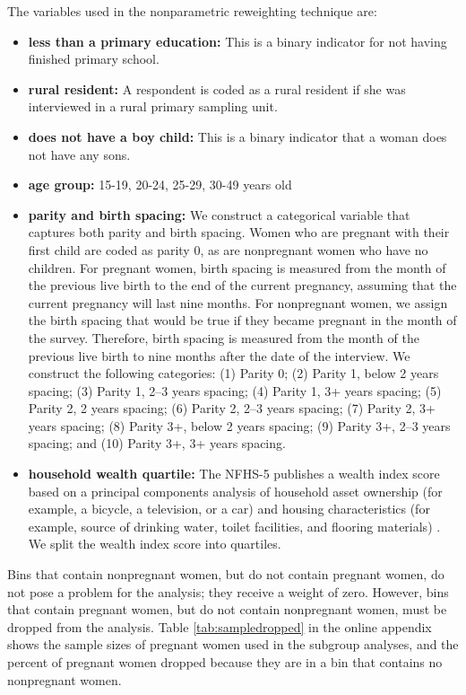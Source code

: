 \documentclass[12pt]{article}
\begin{document}
The variables used in the nonparametric reweighting technique are:
\begin{itemize}
\item {\bf{less than a primary education:}} This is a binary indicator for not having finished primary school.
\item {\bf{rural resident:}} A respondent is coded as a rural resident if she was interviewed in a rural primary sampling unit. 
\item {\bf{does not have a boy child:}} This is a binary indicator that a woman does not have any sons.
\item {\bf{age group:}} 15-19, 20-24, 25-29, 30-49 years old
\item {\bf{parity and birth spacing:}} We construct a categorical variable that captures both parity and birth spacing. Women who are pregnant with their first child are coded as parity 0, as are nonpregnant women who have no children.  For pregnant women, birth spacing is measured from the month of the previous live birth to the end of the current pregnancy, assuming that the current pregnancy will last nine months. For nonpregnant women, we assign the birth spacing that would be true if they became pregnant in the month of the survey.  Therefore, birth spacing is measured from the month of the previous live birth to nine months after the date of the interview. 
We construct the following categories: (1) Parity 0; (2) Parity 1, below 2 years spacing; (3) Parity 1, 2–3 years spacing; (4) Parity 1, 3+ years spacing; (5) Parity 2, 2 years spacing; (6) Parity 2, 2–3 years spacing; (7) Parity 2, 3+ years spacing; (8) Parity 3+, below 2 years spacing; (9) Parity 3+, 2–3 years spacing; and (10) Parity 3+, 3+ years spacing.
\item {\bf{household wealth quartile:}} The NFHS-5 publishes a wealth index score based on a principal components analysis of household asset ownership (for example, a bicycle, a television, or a car) and housing characteristics (for example, source of drinking water, toilet facilities, and flooring materials) \citep{iips_icf_nfhs5_2022}. We split the wealth index score into quartiles. 
\end{itemize}

Bins that contain nonpregnant women, but do not contain pregnant women, do not pose a problem for the analysis; they receive a weight of zero.  However, bins that contain pregnant women, but do not contain nonpregnant women, must be dropped from the analysis. Table \ref{tab:sampledropped} in the online appendix shows the sample sizes of pregnant women used in the subgroup analyses, and the percent of pregnant women dropped because they are in a bin that contains no nonpregnant women.  
\end{document}
